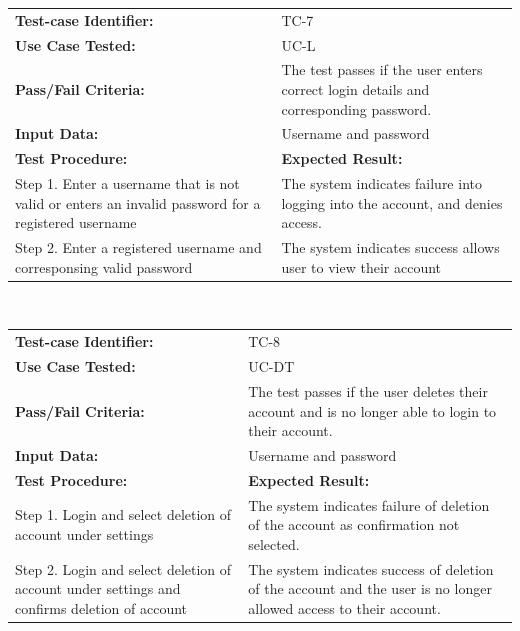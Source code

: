 \documentclass[12pt]{article}
\begin{document}
{\begin{tabular}{| p{8cm} | p{8cm} |} \hline
	\textbf{Test-case Identifier:}& TC-7\\
	\textbf{Use Case Tested:}& UC-L\\
	\textbf{Pass/Fail Criteria:}& The test passes if the user enters correct login details and corresponding password.\\
	\textbf{Input Data:}& Username and password\\\hline
	\textbf{Test Procedure:}& \textbf{Expected Result:} \\\hline
	Step 1. Enter a username that is not valid or enters an invalid password for a registered username & The system indicates failure into logging into the account, and denies access. \\
	Step 2. Enter a registered username and corresponsing valid password  & The system indicates success allows user to view their account\\
		\hline
\end{tabular}
\\

\begin{tabular}{| p{8cm} | p{8cm} |} \hline
	\textbf{Test-case Identifier:}& TC-8\\
	\textbf{Use Case Tested:}& UC-DT\\
	\textbf{Pass/Fail Criteria:}& The test passes if the user deletes their account and is no longer able to login to their account.\\
	\textbf{Input Data:}& Username and password\\\hline
	\textbf{Test Procedure:}& \textbf{Expected Result:} \\\hline
	Step 1. Login and select deletion of account under settings & The system indicates failure of deletion of the account as confirmation not selected. \\
	Step 2. Login and select deletion of account under settings and confirms deletion of account& The system indicates success of deletion of the account and the user is no longer allowed access to their account.\\
		\hline
\end{tabular}
\\

}
\end{document}
